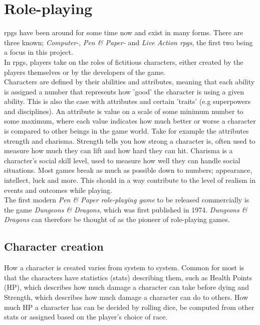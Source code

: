 \section{Role-playing}
\ac{rpgs} have been around for some time now and exist in many forms.
There are three known; \emph{Computer-}, \emph{Pen \& Paper-} and \emph{Live Action \ac{rpgs}}, the first two being a focus in this project.\\
In \ac{rpgs}, players take on the roles of fictitious characters, either created by the players themselves or by the developers of the game.\\
Characters are defined by their abilities and attributes, meaning that each ability is assigned a number that represents how 'good' the character is using a given ability. This is also the case with attributes and certain 'traits' (e.g superpowers and disciplines). An attribute is value on a scale of some minimum number to some maximum, where each value indicates how much better or worse a character is compared to other beings in the game world. Take for example the attributes strength and charisma. Strength tells you how strong a character is, often used to measure how much they can lift and how hard they can hit. Charisma is a character's social skill level, used to measure how well they can handle social situations. Most games break as much as possible down to numbers; appearance, intellect, luck and more.
This should in a way contribute to the level of realism in events and outcomes while playing.\\
The first modern \emph{Pen \& Paper role-playing game} to be released commercially is the game \emph{Dungeons \& Dragons}, which was first published in 1974.\cite{wikidnd}
\emph{Dungeons \& Dragons} can therefore be thought of as the pioneer of role-playing games.

\subsection{Character creation}
How a character is created varies from system to system. Common for most is that the characters have statistics (stats) describing them, such as Health Points (HP), which describes how much damage a character can take before dying and Strength, which describes how much damage a character can do to others. How much HP a character has can be decided by rolling dice, be computed from other stats or assigned based on the player's choice of race.

